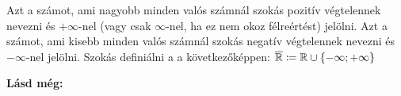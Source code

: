 \begin{note4}
Azt a számot, ami nagyobb minden valós számnál szokás pozitív végtelennek
nevezni és $+\infty$-nel (vagy csak $\infty$-nel, ha ez nem okoz félreértést)
jelölni. Azt a számot, ami kisebb minden valós számnál szokás negatív
végtelennek nevezni és $-\infty$-nel jelölni. Szokás definiálni a
 a következőképpen:
$\overline{\mathbb{R}} \coloneqq \mathbb{R} \cup \{-\infty; +\infty\}$
\end{note4}

\textbf{Lásd még:}
